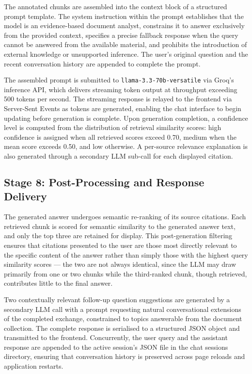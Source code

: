 The annotated chunks are assembled into the context block of a structured prompt template. The system instruction within the prompt establishes that the model is an evidence-based document analyst, constrains it to answer exclusively from the provided context, specifies a precise fallback response when the query cannot be answered from the available material, and prohibits the introduction of external knowledge or unsupported inference. The user's original question and the recent conversation history are appended to complete the prompt.

The assembled prompt is submitted to \texttt{llama-3.3-70b-versatile} via Groq's inference API, which delivers streaming token output at throughput exceeding 500 tokens per second. The streaming response is relayed to the frontend via Server-Sent Events as tokens are generated, enabling the chat interface to begin updating before generation is complete. Upon generation completion, a confidence level is computed from the distribution of retrieval similarity scores: high confidence is assigned when all retrieved scores exceed 0.70, medium when the mean score exceeds 0.50, and low otherwise. A per-source relevance explanation is also generated through a secondary LLM sub-call for each displayed citation.

\subsection{Stage 8: Post-Processing and Response Delivery}

The generated answer undergoes semantic re-ranking of its source citations. Each retrieved chunk is scored for semantic similarity to the generated answer text, and only the top three are retained for display. This post-generation filtering ensures that citations presented to the user are those most directly relevant to the specific content of the answer rather than simply those with the highest query similarity scores --- the two are not always identical, since the LLM may draw primarily from one or two chunks while the third-ranked chunk, though retrieved, contributes little to the final answer.

Two contextually relevant follow-up question suggestions are generated by a secondary LLM call with a prompt requesting natural conversational extensions of the completed exchange, constrained to topics answerable from the document collection. The complete response is serialised to a structured JSON object and transmitted to the frontend. Concurrently, the user query and the assistant response are appended to the active session's JSON file in the chat sessions directory, ensuring that conversation history is preserved across page reloads and application restarts.

